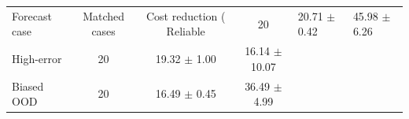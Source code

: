 \begin{tabular}{lccc}
\toprule
Forecast case & Matched cases & Cost reduction (%
\midrule
Reliable & 20 & 20.71 $\pm$ 0.42 & 45.98 $\pm$ 6.26 \\
High-error & 20 & 19.32 $\pm$ 1.00 & 16.14 $\pm$ 10.07 \\
Biased OOD & 20 & 16.49 $\pm$ 0.45 & 36.49 $\pm$ 4.99 \\
\bottomrule
\end{tabular}
